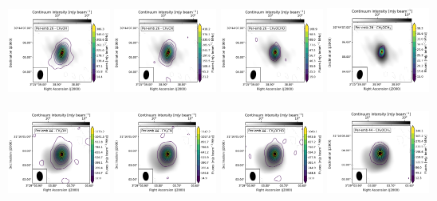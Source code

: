 \documentclass[twocolumn]{aastex62}
\begin{document}
\begin{figure}[htbp!]
  \centering
  \includegraphics[width=0.24\textwidth]{Set1_ID02_CH3OH_243915.pdf}
  \includegraphics[width=0.24\textwidth]{Set1_ID02_CH3CN_257527.pdf}
  \includegraphics[width=0.24\textwidth]{Set1_ID02_CH3OCHO_259342.pdf}
  \includegraphics[width=0.24\textwidth]{Set1_ID02_CH3OCH3_259311.pdf}

  \includegraphics[width=0.24\textwidth]{Set2_ID00_CH3OH_243915.pdf}
  \includegraphics[width=0.24\textwidth]{Set2_ID00_CH3CN_257527.pdf}
  \includegraphics[width=0.24\textwidth]{Set2_ID00_CH3OCHO_259342.pdf}
  \includegraphics[width=0.24\textwidth]{Set2_ID00_CH3OCH3_259311.pdf}


\end{figure}
\end{document}
